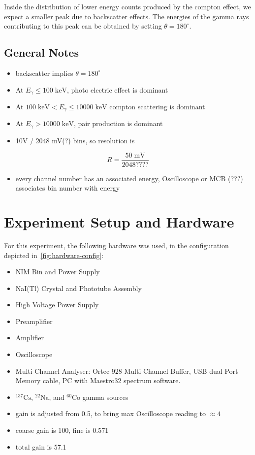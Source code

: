 \documentclass[a4paper]{article}
\begin{document}
Inside the distribution of lower energy counts produced by the compton effect, we expect a smaller peak due to backscatter effects. The energies of the gamma rays contributing to this peak can be obtained by setting $\theta=180^{\circ}$.



\subsection{General Notes}

\begin{itemize}
    \item backscatter implies $\theta=180^{\circ}$
    \item At $E_{\gamma}\leq100\mathrm{\;keV}$, photo electric effect is dominant
    \item At $100\mathrm{\;keV}<E_{\gamma}\leq10000\mathrm{\;keV}$ compton scattering is dominant
    \item At $E_{\gamma}>10000\mathrm{\;keV}$, pair production is dominant
    \item 10V / 2048 mV(?) bins, so resolution is
\end{itemize}
\begin{equation}
    R=\frac{50\;\mathrm{mV}}{2048????}
\end{equation}
\begin{itemize}
    \item every channel number has an associated energy, Oscilloscope or MCB (???) associates bin number with energy
\end{itemize}

\section{Experiment Setup and Hardware}

For this experiment, the following hardware was used, in the configuration depicted in~\autoref{fig:hardware-config}:
\begin{itemize}
    \item NIM Bin and Power Supply
    \item NaI(Tl) Crystal and Phototube Assembly
    \item High Voltage Power Supply
    \item Preamplifier
    \item Amplifier
    \item Oscilloscope
    \item Multi Channel Analyser: Ortec 928 Multi Channel Buffer, USB dual Port Memory cable, PC with Maestro32 spectrum software.
    \item $^{137}\mathrm{Cs}$, $^{22}\mathrm{Na}$, and $^{60}\mathrm{Co}$ gamma sources
    \item gain is adjusted from 0.5, to bring max Oscilloscope reading to $\approx4$
    \item coarse gain is 100, fine is 0.571
    \item total gain is 57.1
\end{itemize}
\end{document}
